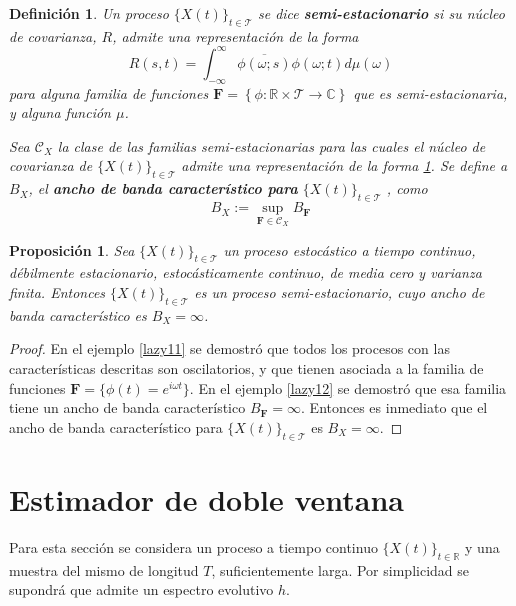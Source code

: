 \documentclass[12pt,letterpaper]{book}
\newtheorem{definicion}{Definición}[chapter]
\newtheorem{proposicion}[teorema]{Proposición}
\newcommand{\R}{\mathbb{R}}
\newcommand{\C}{\mathbb{C}}
\newcommand{\intR}{\int_{-\infty}^{\infty}}
\newcommand{\ef}{\mathbf{F}}
\newcommand{\xt}{$\{X(t)\}_{t\in \mathcal{T}}$ }
\newcommand{\xtin}[1]{$\{X(t)\}_{t\in \mathcal{ #1 }}$ }
\begin{document}
\begin{definicion}
\label{lazy10}
\label{def:semi_estacionario}
Un proceso \xt se dice \textbf{semi-estacionario} si su núcleo de covarianza, $R$, admite una representación de la forma 
\begin{equation}
R(s,t) = \intR \overline{\phi(\omega;s)}\phi(\omega;t) d\mu(\omega)
\end{equation}
para alguna familia de funciones $\ef = \left\{ \phi: \R \times \mathcal{T} \rightarrow \C \right\}$ que es semi-estacionaria, y alguna función $\mu$.

Sea $\mathcal{C}_X$ la clase de las familias semi-estacionarias para las cuales el núcleo de covarianza de \xt admite una representación de la forma \ref{lazy10}. Se define a $B_X$, el \textbf{ancho de banda característico para} \xt, como
\begin{equation}
B_X := \sup_{\ef \in \mathcal{C}_X} B_\ef
\end{equation}
\end{definicion}

\begin{proposicion}
Sea \xt un proceso estocástico a tiempo continuo, débilmente estacionario, estocásticamente continuo, de media cero y varianza finita.
%
Entonces \xt es un proceso semi-estacionario, cuyo ancho de banda característico es $B_X = \infty$.
\end{proposicion}

\begin{proof}
En el ejemplo \ref{lazy11} se demostró que todos los procesos con las características descritas son oscilatorios, y que tienen asociada a la familia de funciones $\ef = \{ \phi(t) = e^{i \omega t} \}$.
%
En el ejemplo \ref{lazy12} se demostró que esa familia tiene un ancho de banda característico $B_\ef = \infty$.
%
Entonces es inmediato que el ancho de banda característico para \xt es $B_X=\infty$.
\end{proof}

\section{Estimador de doble ventana}
\label{sec:doble_ventana}

Para esta sección se considera un proceso a tiempo continuo \xtin{\R} y una muestra del mismo de longitud $T$, suficientemente larga.
%
Por simplicidad se supondrá que admite un espectro evolutivo $h$.
\end{document}
